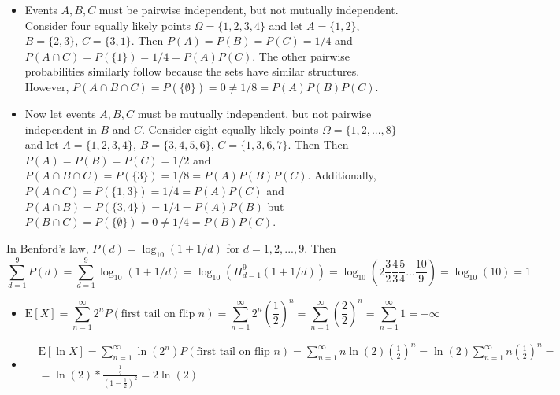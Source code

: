 \documentclass[12pt]{article}
\newcommand{\E}{\mathrm{E}}
\newenvironment{problem}[2][Problem]{\begin{trivlist}
\item[\hskip \labelsep {\bfseries #1}\hskip \labelsep {\bfseries #2}]}{\end{trivlist}}
\begin{document}
\begin{problem}{2.} \hfill
\begin{itemize}
\item[(a)] Events $A,B,C$ must be pairwise independent, but not mutually independent. Consider four equally likely points $\Omega  = \{1,2,3,4\}$ and let $A = \{1,2\}$, $B = \{2,3\}$, $C = \{3,1\}$. Then $P(A) = P(B) = P(C) = 1/4$ and $P(A\cap C) = P(\{1\}) = 1/4 = P(A)P(C)$.  The other pairwise probabilities similarly follow because the sets have similar structures. However, $P(A\cap B \cap C) = P(\{\emptyset\}) = 0 \neq 1/8 = P(A)P(B) P(C)$. 

\item[(b)] Now let events $A,B,C$ must be mutually independent, but not pairwise independent in $B$ and $C$. Consider eight equally likely points $\Omega  = \{1,2,...,8\}$ and let $A = \{1,2,3,4\}$, $B = \{3,4,5,6\}$, $C = \{1,3,6,7\}$. Then Then $P(A) = P(B) = P(C) = 1/2$ and $P(A\cap B \cap C) = P(\{3\}) = 1/8 = P(A)P(B) P(C)$. Additionally, $P(A\cap C) = P(\{1,3\}) = 1/4 = P(A)P(C)$ and $P(A\cap B) = P(\{3,4\}) = 1/4 = P(A)P(B)$ but $P(B\cap C) = P(\{\emptyset\}) = 0 \neq 1/4 = P(B)P(C)$. 
\end{itemize}
\end{problem}

\begin{problem}{3.} 
In Benford's law, $P(d) =  \log_{10}(1 + 1/d)$ for $d = 1,2,...,9$. Then $$\sum_{d=1}^9 P(d) = \sum_{d=1}^9 \log_{10}(1 + 1/d) = \log_{10}(\Pi_{d=1}^9 (1 + 1/d)) = \log_{10}(2\frac{3}{2}\frac{4}{3}\frac{5}{4}...\frac{10}{9}) = \log_{10}(10) = 1$$
\end{problem}

\begin{problem}{4.} \hfill
\begin{itemize}
\item[(a)] $$\E[X] = \sum_{n=1}^\infty 2^nP(\text{first tail on flip } n) = \sum_{n=1}^\infty 2^n (\frac{1}{2})^n = \sum_{n=1}^\infty (\frac{2}{2})^n = \sum_{n=1}^\infty 1 = +\infty$$
\item[(b)] \begin{equation*}
\begin{aligned}
&\E[\ln X] = \sum_{n=1}^\infty \ln(2^n) P(\text{first tail on flip } n) = \sum_{n=1}^\infty n \ln(2) (\frac{1}{2})^n 
= \ln(2) \sum_{n=1}^\infty n(\frac{1}{2})^n =\\ &= \ln(2)*\frac{\frac{1}{2}}{(1-\frac{1}{2})^2} = 2 \ln(2)
\end{aligned}
\end{equation*}
\end{itemize}
\end{problem}
\end{document}
